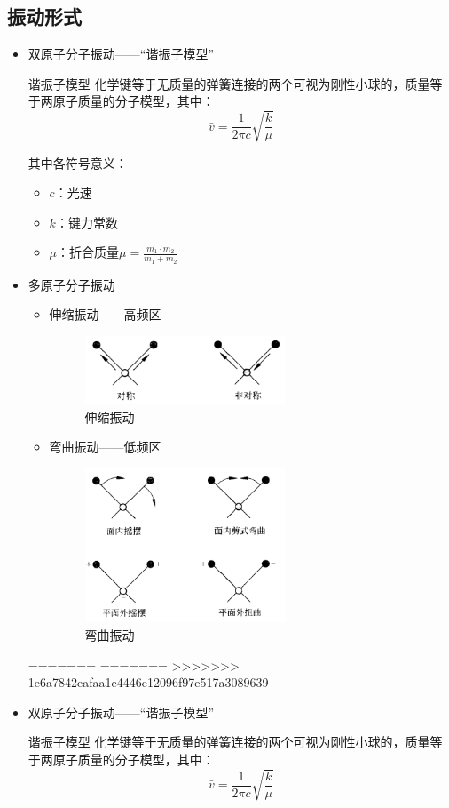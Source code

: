 \subsection{振动形式}
\begin{itemize}
<<<<<<< HEAD
<<<<<<< HEAD
    \item 双原子分子振动——“谐振子模型”
    \begin{theorem*}{谐振子模型}
        化学键等于无质量的弹簧连接的两个可视为刚性小球的，质量等于两原子质量的分子模型，其中：
        \begin{equation*}
            \bar{v}=\frac{1}{2\pi c}\sqrt{\frac{k}{\mu}}
        \end{equation*}
        
        其中各符号意义：
            \begin{itemize}
                \item $c$：光速
                \item $k$：键力常数
                \item $\mu$：折合质量$\mu=\frac{m_{1}\cdot m_{2}}{m_{1}+m_{2}}$
            \end{itemize}
    \end{theorem*}
    \item 多原子分子振动
    \begin{itemize}
        \item 伸缩振动——高频区
        \begin{figure}[ht]
            \centering
            \includegraphics[width=6cm]{image/chp5_flex_vir.png}
            \caption{伸缩振动}
            \label{fig:flex}
       \end{figure}
        \item 弯曲振动——低频区
        \begin{figure}[ht]
            \centering
            \includegraphics[width=6cm]{image/chp5_twi_vir.png}
            \caption{弯曲振动}
            \label{fig:twist}
       \end{figure}
    \end{itemize}
=======
=======
>>>>>>> 1e6a7842eafaa1e4446e12096f97e517a3089639
	\item 双原子分子振动——“谐振子模型”
	\begin{theorem*}{谐振子模型}
		化学键等于无质量的弹簧连接的两个可视为刚性小球的，质量等于两原子质量的分子模型，其中：
		\begin{equation*}
		\bar{v}=\frac{1}{2\pi c}\sqrt{\frac{k}{\mu}}
		\end{equation*}
		

\end{theorem*}
\end{itemize}
